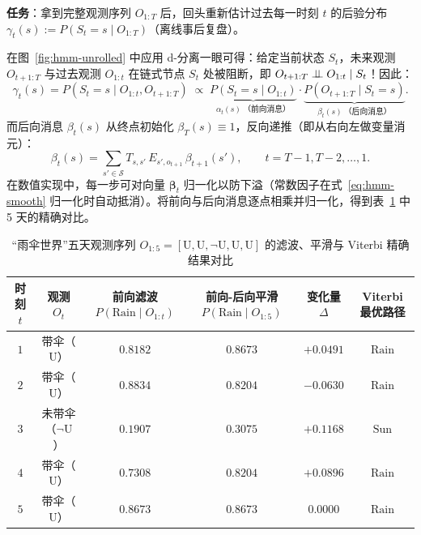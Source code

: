 \textbf{任务}：拿到完整观测序列 $O_{1:T}$ 后，回头重新估计过去每一时刻 $t$ 的后验分布 $\gamma_t(s) := P(S_t = s \mid O_{1:T})$（离线事后复盘）。

在图~\ref{fig:hmm-unrolled} 中应用 d-分离一眼可得：给定当前状态 $S_t$，未来观测 $O_{t+1:T}$ 与过去观测 $O_{1:t}$ 在链式节点 $S_t$ 处被阻断，即 $O_{t+1:T} \perp\!\!\!\perp O_{1:t} \mid S_t$！因此：
\begin{equation}\label{eq:hmm-smooth}
  \gamma_t(s) = P(S_t = s \mid O_{1:t}, O_{t+1:T})
  \;\propto\; \underbrace{P(S_t = s \mid O_{1:t})}_{\alpha_t(s)\ \text{（前向消息）}}
             \cdot \underbrace{P(O_{t+1:T} \mid S_t = s)}_{\beta_t(s)\ \text{（后向消息）}}.
\end{equation}
而后向消息 $\beta_t(s)$ 从终点初始化 $\beta_T(s) \equiv 1$，反向递推（即从右向左做变量消元）：
\begin{equation}\label{eq:hmm-backward}
  \beta_t(s) = \sum_{s' \in \mathcal{S}} T_{s, s'}\, E_{s', o_{t+1}}\, \beta_{t+1}(s'), \qquad t = T-1, T-2, \dots, 1.
\end{equation}
在数值实现中，每一步可对向量 $\boldsymbol{\beta}_t$ 归一化以防下溢（常数因子在式~\eqref{eq:hmm-smooth} 归一化时自动抵消）。将前向与后向消息逐点相乘并归一化，得到表~\ref{tab:hmm-umbrella} 中 5 天的精确对比。

\begin{table}[htbp]
\centering
\caption{“雨伞世界”五天观测序列 $O_{1:5} = [\text{U}, \text{U}, \neg\text{U}, \text{U}, \text{U}]$ 的滤波、平滑与 Viterbi 精确结果对比}
\label{tab:hmm-umbrella}
\small
\begin{tabular}{@{}cccccc@{}}
\toprule
时刻 $t$ & 观测 $O_t$ & 前向滤波 $P(\text{Rain}\mid O_{1:t})$ & 前向-后向平滑 $P(\text{Rain}\mid O_{1:5})$ & 变化量 $\Delta$ & Viterbi 最优路径 \\
\midrule
$1$ & 带伞（$\text{U}$）   & $0.8182$ & $0.8673$ & $+0.0491$ & $\text{Rain}$ \\
$2$ & 带伞（$\text{U}$）   & $0.8834$ & $0.8204$ & $-0.0630$ & $\text{Rain}$ \\
$3$ & 未带伞（$\neg\text{U}$） & $\mathbf{0.1907}$ & $\mathbf{0.3075}$ & $\mathbf{+0.1168}$ & $\text{Sun}$ \\
$4$ & 带伞（$\text{U}$）   & $0.7308$ & $0.8204$ & $+0.0896$ & $\text{Rain}$ \\
$5$ & 带伞（$\text{U}$）   & $0.8673$ & $0.8673$ & $0.0000$ & $\text{Rain}$ \\
\bottomrule
\end{tabular}
\end{table}

